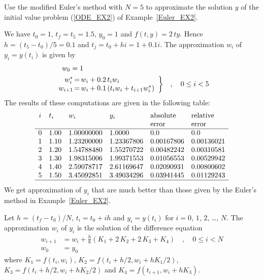 \begin{egg}
Use the modified Euler's method with $N=5$ to approximate the solution
$y$ of the initial value problem (\ref{ODE_EX2}) of
Example~\ref{Euler_EX2}.

We have $t_0=1$, $t_f= t_5 =1.5$, $y_0=1$ and $f(t,y) = 2\,ty$.  Hence
$h = (t_5-t_0)/5 = 0.1$ and $t_j = t_0 + hi =1 + 0.1i$.  The
approximation $w_i$ of $y_i = y(t_i)$ is given by
\begin{align*}
& \quad w_0 = 1 \\
&\begin{array}{r@{\,=\,}l}
w_i^\ast &  w_i + 0.2\,t_i w_i \\
w_{i+1} & w_i +  0.1 \left( t_i w_i + t_{i+1}  w_i^\ast \right)
\end{array} \bigg\} \quad, \quad 0 \leq i < 5
\end{align*}
The results of these computations are given in the following table:
\[
\begin{array}{clllll}
i & t_i & w_i & y_i & \text{absolute} & \text{relative} \\
 & & & & \text{error} & \text{error} \\
\hline
0 & 1.00 & 1.00000000 & 1.0000 & 0.0 & 0.0 \\
1 & 1.10 & 1.23200000 & 1.23367806 & 0.00167806 & 0.00136021 \\
2 & 1.20 & 1.54788480 & 1.55270722 & 0.00482242 & 0.00310581 \\
3 & 1.30 & 1.98315006 & 1.99371553 & 0.01056553 & 0.00529942 \\
4 & 1.40 & 2.59078717 & 2.61169647 & 0.02090931 & 0.00800602 \\
5 & 1.50 & 3.45092851 & 3.49034296 & 0.03941445 & 0.01129243 \\
\hline
\end{array}
\]
We get approximation of $y_i$ that are much better than those given by
the Euler's method in Example~\ref{Euler_EX2}.
\label{ModEuler_EX}
\end{egg}

\begin{defn}
Let $h=(t_f-t_0)/N$, $t_i=t_0+ih$ and $y_i = y(t_i)$ for $i=0$,
$1$, $2$, \ldots, $N$.  The approximation $w_i$ of $y_i$ is the
solution of the difference equation
\begin{align*}
w_{i+1} & = w_i + \frac{h}{6}(K_1 + 2\,K_2+2\,K_3 + K_4) \quad, \quad
0 \leq i < N \\
w_0 & = y_0
\end{align*}
where $\displaystyle K_1 = f(t_i,w_i)$,
$\displaystyle K_2 = f(t_i+ h/2,w_i+ h K_1/2)$,
$\displaystyle K_3 = f(t_i+h/2,w_i+ h K_2/2)$ and
$\displaystyle K_4 = f(t_{i+1},w_i+ h K_3)$.
\end{defn}

